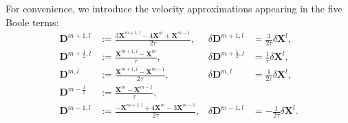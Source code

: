 \documentclass[smallextended]{svjour3}
\numberwithin{equation}{section}
\begin{document}
	For convenience, we introduce the velocity approximations appearing in the five Boole terms:
	\begin{align}
		\mathbf{D}^{m+1,l}
		&:=
		\frac{3\mathbf{X}^{m+1,l}-4\mathbf{X}^{m}+\mathbf{X}^{m-1}}{2\tau},
		&
		\delta\mathbf{D}^{m+1,l}
		&=
		\frac{3}{2\tau}\delta\mathbf{X}^{l},
		\\
		\mathbf{D}^{m+\frac12,l}
		&:=
		\frac{\mathbf{X}^{m+1,l}-\mathbf{X}^{m}}{\tau},
		&
		\delta\mathbf{D}^{m+\frac12,l}
		&=
		\frac{1}{\tau}\delta\mathbf{X}^{l},
		\\
		\mathbf{D}^{m,l}
		&:=
		\frac{\mathbf{X}^{m+1,l}-\mathbf{X}^{m-1}}{2\tau},
		&
		\delta\mathbf{D}^{m,l}
		&=
		\frac{1}{2\tau}\delta\mathbf{X}^{l},
		\\
		\mathbf{D}^{m-\frac12}
		&:=
		\frac{\mathbf{X}^{m}-\mathbf{X}^{m-1}}{\tau},
		\\
		\mathbf{D}^{m-1,l}
		&:=
		\frac{-\mathbf{X}^{m+1,l}+4\mathbf{X}^{m}-3\mathbf{X}^{m-1}}{2\tau},
		&
		\delta\mathbf{D}^{m-1,l}
		&=
		-\frac{1}{2\tau}\delta\mathbf{X}^{l}.
	\end{align}
	
\end{document}
